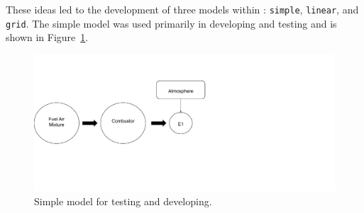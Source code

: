\documentclass[smallextended,referee]{svjour3}
\begin{document}
These ideas led to the development of three models within \pyplume: \texttt{simple}, \texttt{linear}, and \texttt{grid}. The simple model was used primarily in developing and testing and is shown in Figure~\ref{fig:simple}. 

\begin{figure}[htb!]
    \centering
    \includegraphics[scale=\SCALE,trim=1cm 5cm 1cm 4cm]{examples/report/figures/simple.pdf}
    \caption{Simple model for testing and developing.}
    \label{fig:simple}
\end{figure}
\end{document}
